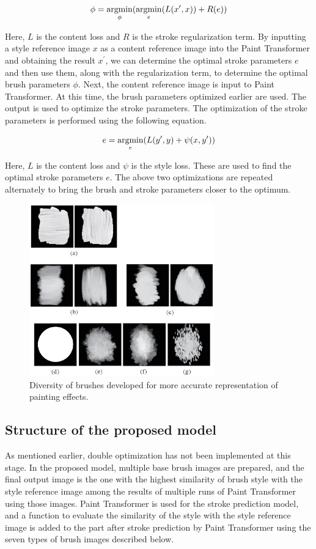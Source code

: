 \documentclass{mva_style}
\begin{document}
\begin{equation}
  \phi = \mathop{\rm argmin}\limits_{\phi}(\mathop{\rm argmin}\limits_{e}(L(x^{\prime}, x)) + R(e))
\end{equation}

Here, $L$ is the content loss and $R$ is the stroke regularization term. By 
inputting a style reference image $x$ as a content reference image into the 
Paint Transformer and obtaining the result $x^{\prime}$, we can determine the 
optimal stroke parameters $e$ and then use them, along with the regularization term, 
to determine the optimal brush parameters $\phi$.
Next, the content reference image is input to Paint Transformer. At this time, 
the brush parameters optimized earlier are used. The output is used to optimize 
the stroke parameters. The optimization of the stroke parameters is performed 
using the following equation.

\begin{equation}
  e = \mathop{\rm argmin}\limits_{e}(L(y^{\prime}, y) + \psi(x, y^{\prime}))
\end{equation}

Here, $L$ is the content loss and $\psi$ is the style loss. These are used to 
find the optimal stroke parameters $e$.
The above two optimizations are repeated alternately to bring the brush and 
stroke parameters closer to the optimum.

\begin{figure}[t]
  \centering
  \includegraphics[width=80mm]{resource/brushes.eps}
  \caption{Diversity of brushes developed for more accurate representation of painting effects.}
  \label{fig:brushes}
\end{figure}


\subsection{Structure of the proposed model}
As mentioned earlier, double optimization has not been implemented at this 
stage. In the proposed model, multiple base brush images are prepared, and 
the final output image is the one with the highest similarity of brush style 
with the style reference image among the results of multiple runs of Paint 
Transformer using those images. 
Paint Transformer is used for the stroke prediction model, and a function to 
evaluate the similarity of the style with the style reference image is added 
to the part after stroke prediction by Paint Transformer using the seven 
types of brush images described below.
\end{document}
